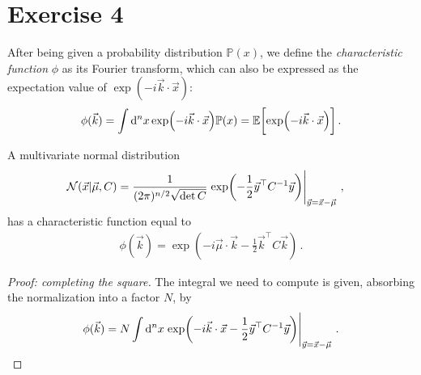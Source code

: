 \documentclass[main.tex]{subfiles}
\begin{document}
\section{Exercise 4}


After being given a probability distribution \(\mathbb{P}(x)\), we define the \emph{characteristic function} \(\phi \) as its Fourier transform, which can also be expressed as the expectation value of \(\exp(- i \vec{k} \cdot \vec{x})\): 
%
\begin{align}
\phi (\vec{k}) = \int \dd[n]{x} \exp(- i \vec{k} \cdot \vec{x}) \mathbb{P}(x) 
= \mathbb{E} \qty[ \exp(- i \vec{k} \cdot \vec{x})]
\,.
\end{align}

\begin{claim}
A multivariate normal distribution 
%
\begin{align}
\mathcal{N}(\vec{x} | \vec{\mu}, C)
&= \frac{1}{(2\pi )^{n/2} \sqrt{\det C}} \eval{\exp(- \frac{1}{2} \vec{y}^{\top} C^{-1} \vec{y})}_{\vec{y} = \vec{x} - \vec{\mu}}
\,,
\end{align}
%
has a characteristic function equal to 
%
\begin{align}
\phi (\vec{k}) = \exp(- i \vec{\mu}\cdot \vec{k} - \frac{1}{2} \vec{k}^{\top} C \vec{k}) 
\,.
\end{align}
\end{claim}

\begin{proof}[Proof: completing the square]
The integral we need to compute is given, absorbing the normalization into a factor \(N\), by 
%
\begin{align}
\phi (\vec{k}) = N \int \dd[n]{x} \eval{\exp(- i \vec{k} \cdot \vec{x} - \frac{1}{2} \vec{y}^{\top} C^{-1} \vec{y})}_{\vec{y} = \vec{x} - \vec{\mu}}
\,.
\end{align}
\end{proof}
\end{document}
